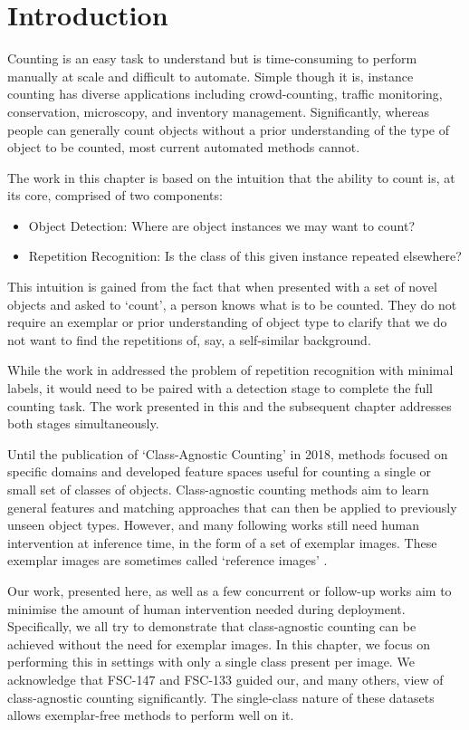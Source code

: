 \documentclass[../thesis.tex]{subfiles}
\begin{document}
\section{Introduction}
\label{LTCA__sec__Introduction}
Counting is an easy task to understand but is time-consuming to perform manually at scale and difficult to automate. 
Simple though it is, instance counting has diverse applications including crowd-counting, traffic monitoring, conservation, microscopy, and inventory management.
Significantly, whereas people can generally count objects without a prior understanding of the type of object to be counted, most current automated methods cannot.


The work in this chapter is based on the intuition that the ability to count is, at its core, comprised of two components: 
\begin{itemize}
    \item Object Detection: Where are object instances we may want to count?
    \item Repetition Recognition: Is the class
of this given instance repeated elsewhere?
\end{itemize}

This intuition is gained from the fact that when presented with a set of novel objects and asked to `count', a person knows what is to be counted. They do not require an exemplar or prior understanding of object type to clarify that we do not want to find the repetitions of, say, a self-similar background.

While the work in  addressed the problem of repetition recognition with minimal labels, it would need to be paired with a detection stage to complete the full counting task.
The work presented in this and the subsequent chapter addresses both stages simultaneously.

Until the publication of `Class-Agnostic Counting' \cite{Lu18} in 2018, methods focused on specific domains and developed feature spaces useful for counting a single or small set of classes of objects. Class-agnostic counting methods aim to learn general features and matching approaches that can then be applied to previously unseen object types. 
However, \citet{Lu18} and many following works \cite{ranjan2021Famnet, yang2021cfoc,sokhandan2020few} still need human intervention at inference time, in the form of a set of exemplar images. 
These exemplar images are sometimes called `reference images' \cite{ltcahobley}.

Our work, presented here, as well as a few concurrent or follow-up works \cite{ranjan2022exemplar,liu2022countr, xu2023zsc} aim to minimise the amount of human intervention needed during deployment. 
Specifically, we all try to demonstrate that class-agnostic counting can be achieved without the need for exemplar images.
In this chapter, we focus on performing this in settings with only a single class present per image.
We acknowledge that FSC-147 and FSC-133 guided our, and many others, view of class-agnostic counting significantly. 
The single-class nature of these datasets allows exemplar-free methods to perform well on it. 
\end{document}
